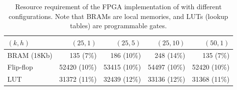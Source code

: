 \begin{table}
\begin{center}
\small
\begin{tabular}{ l r r r r } 
\toprule
$(k, h)$ & $(25, 1)$ & $(25, 5)$ & $(25,10)$ & $(50, 1)$ \\
\midrule
BRAM (18Kb) & 135 (7\%) & 186 (10\%) & 248 (14\%) & 135 (7\%) \\
Flip-flop & 52420 (10\%) & 53415 (10\%) & 54497 (10\%) & 52420 (10\%) \\
LUT & 31372 (11\%) & 32439 (12\%) & 33136 (12\%) & 31368 (11\%) \\
\bottomrule
\end{tabular}
\caption{Resource requirement %
of the FPGA %
implementation of \OurSys with different configurations.  Note that BRAMs are local memories,
and LUTs (lookup tables) are programmable gates.} %
\label{tab:microbenchmarks}
\end{center}
\end{table}

